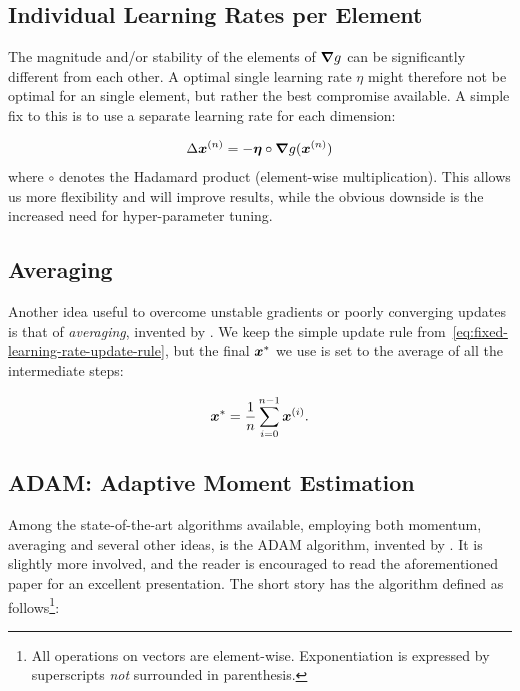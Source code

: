 \documentclass[Thesis.tex]{subfiles}
\begin{document}
\subsection{Individual Learning Rates per Element}

The magnitude and/or stability of the elements of $\grad{g}$ can be
significantly different from each other. A optimal single learning rate $\eta$ might
therefore not be optimal for an single element, but rather the best compromise
available. A simple fix to this is to use a separate learning rate for each
dimension:

\begin{align}
  \Delta\bm{x}^{(n)} = -\bm{\eta}\circ\grad{g}(\bm{x}^{(n)})
\end{align}
where $\circ$ denotes the Hadamard product (element-wise multiplication). This
allows us more flexibility and will improve results, while the obvious downside
is the increased need for hyper-parameter tuning.


\subsection{Averaging}

Another idea useful to overcome unstable gradients or poorly converging updates
is that of \emph{averaging}, invented by \textcite{Polyak-1992}. We keep the
simple update rule from~\cref{eq:fixed-learning-rate-update-rule}, but the final
$\bm{x}^*$ we use is set to the average of all the intermediate steps:

\begin{align}
  \label{eq:averaging-update-rule-def}
  \bm{x}^* = \frac{1}{n}\sum_{i=0}^{n-1} \bm{x}^{(i)}.
\end{align}

\subsection{ADAM: Adaptive Moment Estimation}
\label{sec:adam}

Among the state-of-the-art algorithms available, employing both momentum,
averaging and several other ideas, is the ADAM algorithm, invented by
\textcite{KingmaB14}. It is slightly more involved, and the reader is encouraged
to read the aforementioned paper for an excellent presentation. The short story
has the algorithm defined as follows\footnote{All operations on vectors are
  element-wise. Exponentiation is expressed by superscripts \emph{not}
  surrounded in parenthesis.}:
\end{document}

